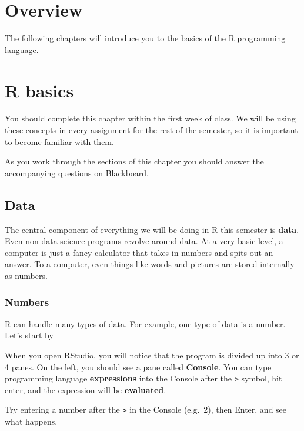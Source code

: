 \documentclass[
]{book}
\begin{document}
\hypertarget{overview}{%
\chapter{Overview}\label{overview}}

The following chapters will introduce you to the basics of the R programming language.

\hypertarget{r-basics}{%
\chapter{R basics}\label{r-basics}}

You should complete this chapter within the first week of class. We will be using these concepts in every assignment for the rest of the semester, so it is important to become familiar with them.

As you work through the sections of this chapter you should answer the accompanying questions on Blackboard.

\hypertarget{rbasics-data}{%
\section{Data}\label{rbasics-data}}

The central component of everything we will be doing in R this semester is \textbf{data}. Even non-data science programs revolve around data. At a very basic level, a computer is just a fancy calculator that takes in numbers and spits out an answer. To a computer, even things like words and pictures are stored internally as numbers.

\hypertarget{rbasics-numbers}{%
\subsection{Numbers}\label{rbasics-numbers}}

R can handle many types of data. For example, one type of data is a number. Let's start by

When you open RStudio, you will notice that the program is divided up into 3 or 4 panes. On the left, you should see a pane called \textbf{Console}. You can type programming language \textbf{expressions} into the Console after the \texttt{\textgreater{}} symbol, hit enter, and the expression will be \textbf{evaluated}.

Try entering a number after the \texttt{\textgreater{}} in the Console (e.g.~2), then Enter, and see what happens.
\end{document}
